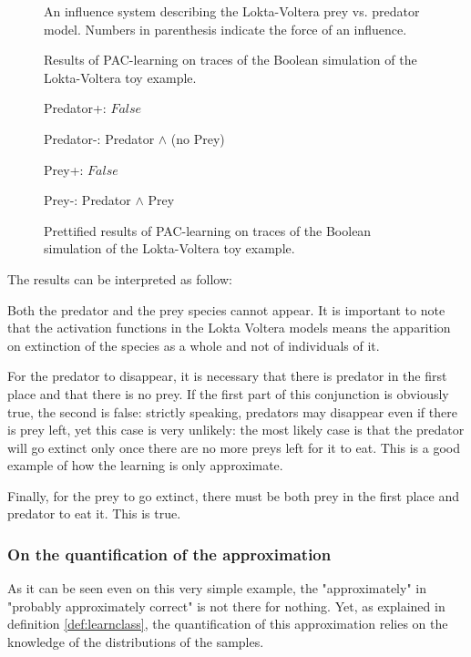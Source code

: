 \documentclass{llncs}
\begin{document}
\begin{figure}[htp]
	
	\vspace{-1em}
	\caption{An influence system describing the Lokta-Voltera prey vs. predator model. Numbers in parenthesis indicate the force of an influence. \label{bool-LV}}
\end{figure}
\begin{figure}[htp]
	
	\vspace{-1em}
	\caption{Results of PAC-learning on traces of the Boolean simulation of the Lokta-Voltera toy example.\label{bool-LV.res}}
\end{figure}
\begin{figure}[htp]
	\ttfamily
	Predator+: $False$
	
	Predator-: Predator $\wedge$ (no Prey)
	
	Prey+: $False$
	
	Prey-: Predator $\wedge$ Prey
	\rmfamily
	\caption{Prettified results of PAC-learning on traces of the Boolean simulation of the Lokta-Voltera toy example.\label{bool-LV.res.pretty}}
\end{figure}
\pagebreak
The results can be interpreted as follow:

Both the predator and the prey species cannot appear. It is important to note that the activation functions in the Lokta Voltera models means the apparition on extinction of the species as a whole and not of individuals of it.

For the predator to disappear, it is necessary that there is predator in the first place and that there is no prey. If the first part of this conjunction is obviously true, the second is false: strictly speaking, predators may disappear even if there is prey left, yet this case is very unlikely: the most likely case is that the predator will go extinct only once there are no more preys left for it to eat. This is a good example of how the learning is only approximate.

Finally, for the prey to go extinct, there must be both prey in the first place and predator to eat it. This is true.

\subsubsection{On the quantification of the approximation}

As it can be seen even on this very simple example, the "approximately" in "probably approximately correct" is not there for nothing. Yet, as explained in definition \ref{def:learnclass}, the quantification of this approximation relies on the knowledge of the distributions of the samples.
\end{document}
